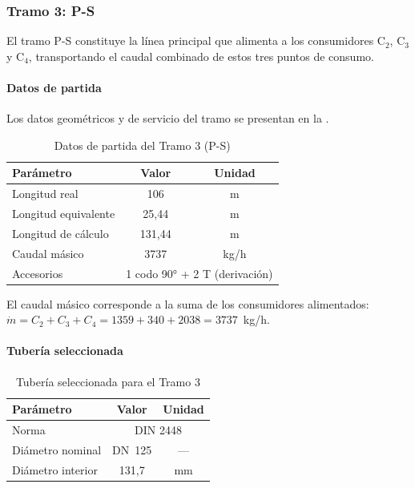 \documentclass[12pt]{article}
\begin{document}
\subsubsection{Tramo 3: P-S}
\label{subsubsec:tramo3-p-s}

El tramo P-S constituye la línea principal que alimenta a los consumidores C$_2$, C$_3$ y C$_4$, transportando el caudal combinado de estos tres puntos de consumo.

\paragraph{Datos de partida}

Los datos geométricos y de servicio del tramo se presentan en la .

\begin{table}[H]
	\centering
	\caption{Datos de partida del Tramo 3 (P-S)}
	\label{tab:datos-tramo3}
	\begin{tabular}{lcc}
		\toprule
		\textbf{Parámetro}   & \textbf{Valor}                                    & \textbf{Unidad} \\
		\midrule
		Longitud real        & 106                                               & m               \\
		Longitud equivalente & 25{,}44                                           & m               \\
		Longitud de cálculo  & 131{,}44                                          & m               \\
		Caudal másico        & 3737                                              & kg/h            \\
		Accesorios           & \multicolumn{2}{c}{1 codo 90° + 2 T (derivación)}                   \\
		\bottomrule
	\end{tabular}
\end{table}

El caudal másico corresponde a la suma de los consumidores alimentados: $\dot{m} = C_2 + C_3 + C_4 = 1359 + 340 + 2038 = 3737$~kg/h.

\paragraph{Tubería seleccionada}

\begin{table}[H]
	\centering
	\caption{Tubería seleccionada para el Tramo 3}
	\label{tab:tuberia-tramo3}
	\begin{tabular}{lcc}
		\toprule
		\textbf{Parámetro} & \textbf{Valor}               & \textbf{Unidad} \\
		\midrule
		Norma              & \multicolumn{2}{c}{DIN 2448}                   \\
		Diámetro nominal   & DN~125                       & ---             \\
		Diámetro interior  & 131{,}7                      & mm              \\
		\bottomrule
	\end{tabular}
\end{table}
\end{document}
